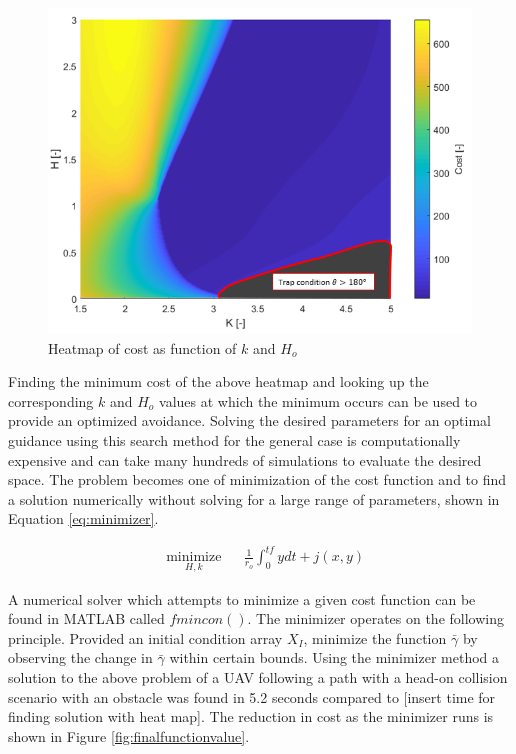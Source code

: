 \documentclass[numbered,pdftex]{ohio-etd}
\begin{document}
\begin{figure}[H]
	\centering
	\includegraphics[trim=0 0 0 10,clip,width=16cm]{PaperFigures/Methods/costHandRwithTrap.png}
	\caption{Heatmap of cost as function of $k$ and $H_o$}
	\label{fig:costHandR}
\end{figure}

Finding the minimum cost of the above heatmap and looking up the corresponding $k$ and $H_o$ values at which the minimum occurs can be used to provide an optimized avoidance. Solving the desired parameters for an optimal guidance using this search method for the general case is computationally expensive and can take many hundreds of simulations to evaluate the desired space. The problem becomes one of minimization of the cost function and to find a solution numerically without solving for a large range of parameters, shown in Equation \ref{eq:minimizer}.

\begin{equation}
\label{eq:minimizer}
\begin{aligned}
& \underset{H,k}{\text{minimize}}
& & \frac{1}{r_o}\int_{0}^{tf}ydt + j(x,y) 
\end{aligned}
\end{equation}

A numerical solver which attempts to minimize a given cost function can be found in MATLAB called $fmincon()$. The minimizer operates on the following principle. Provided an initial condition array $X_I$, minimize the function $\bar{\gamma}$ by observing the change in $\bar{\gamma}$ within certain bounds. Using the minimizer method a solution to the above problem of a UAV following a path with a head-on collision scenario with an obstacle was found in 5.2 seconds compared to [insert time for finding solution with heat map]. The reduction in cost as the minimizer runs is shown in Figure \ref{fig:finalfunctionvalue}.
\end{document}
